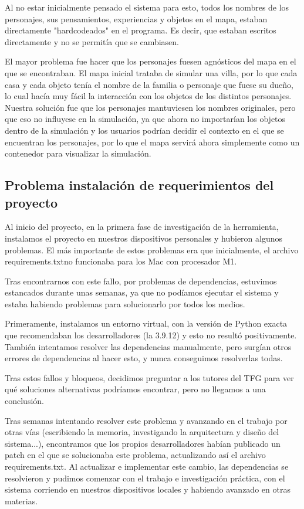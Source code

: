 Al no estar inicialmente pensado el sistema para esto, todos los nombres de los personajes, sus pensamientos, experiencias y objetos en el mapa, estaban directamente "hardcodeados" en el programa. Es decir, que estaban escritos directamente y no se permitía que se cambiasen.

El mayor problema fue hacer que los personajes fuesen agnósticos del mapa en el que se encontraban. El mapa inicial trataba de simular una villa, por lo que cada casa y cada objeto tenía el nombre de la familia o personaje que fuese su dueño, lo cual hacía muy fácil la interacción con los objetos de los distintos personajes. Nuestra solución fue que los personajes mantuviesen los nombres originales, pero que eso no influyese en la simulación, ya que ahora no importarían los objetos dentro de la simulación y los usuarios podrían decidir el contexto en el que se encuentran los personajes, por lo que el mapa servirá ahora simplemente como un contenedor para visualizar la simulación.

\subsection{Problema instalación de requerimientos del proyecto}

Al inicio del proyecto, en la primera fase de investigación de la herramienta, instalamos el proyecto en nuestros dispositivos personales y hubieron algunos problemas. El más importante de estos problemas era que inicialmente, el archivo \textquotesingle requirements.txt\textquotesingle no funcionaba para los Mac con procesador M1.

Tras encontrarnos con este fallo, por problemas de dependencias, estuvimos estancados durante unas semanas, ya que no podíamos ejecutar el sistema y estaba habiendo problemas para solucionarlo por todos los medios.

Primeramente, instalamos un entorno virtual, con la versión de Python exacta que recomendaban los desarrolladores (la 3.9.12) y esto no resultó positivamente. También intentamos resolver las dependencias manualmente, pero surgían otros errores de dependencias al hacer esto, y nunca conseguimos resolverlas todas.

Tras estos fallos y bloqueos, decidimos preguntar a los tutores del TFG para ver qué soluciones alternativas podríamos encontrar, pero no llegamos a una conclusión. 

Tras semanas intentando resolver este problema y avanzando en el trabajo por otras vías (escribiendo la memoria, investigando la arquitectura y diseño del sistema...), encontramos que los propios desarrolladores habían publicado un patch en el que se solucionaba este problema, actualizando así el archivo requirements.txt. Al actualizar e implementar este cambio, las dependencias se resolvieron y pudimos comenzar con el trabajo e investigación práctica, con el sistema corriendo en nuestros dispositivos locales y habiendo avanzado en otras materias.

